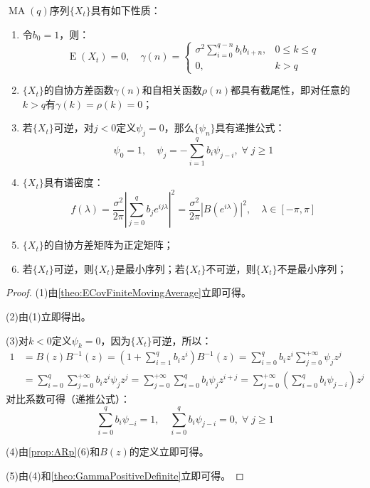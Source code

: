 \begin{property}
	$\operatorname{MA}(q)$序列$\{X_t\}$具有如下性质：
	\begin{enumerate}
		\item 令$b_0=1$，则：
		\begin{equation*}
			\operatorname{E}(X_t)=0,\quad\gamma(n)=
			\begin{cases}
				\sigma^2\sum\limits_{i=0}^{q-n}b_ib_{i+n},&0\leqslant k\leqslant q \\
				0, &k>q
			\end{cases}
		\end{equation*}
		\item $\{X_t\}$的自协方差函数$\gamma(n)$和自相关函数$\rho(n)$都具有截尾性，即对任意的$k>q$有$\gamma(k)=\rho(k)=0$；
		\item 若$\{X_t\}$可逆，对$j<0$定义$\psi_j=0$，那么$\{\psi_n\}$具有递推公式：
		\begin{equation*}
			\psi_0=1,\quad\psi_j=-\sum_{i=1}^{q}b_i\psi_{j-i},\;\forall\;j\geqslant1
		\end{equation*}
		\item $\{X_t\}$具有谱密度：
		\begin{equation*}
			f(\lambda)=\frac{\sigma^2}{2\pi}\left|\sum_{j=0}^{q}b_je^{ij\lambda}\right|^2=\frac{\sigma^2}{2\pi}|B(e^{i\lambda})|^2,\quad\lambda\in[-\pi,\pi]
		\end{equation*}
		\item $\{X_t\}$的自协方差矩阵为正定矩阵；
		\item 若$\{X_t\}$可逆，则$\{X_t\}$是最小序列；若$\{X_t\}$不可逆，则$\{X_t\}$不是最小序列；
	\end{enumerate}
\end{property}
\begin{proof}
	(1)由\cref{theo:ECovFiniteMovingAverage}立即可得。\par
	(2)由(1)立即得出。\par
	(3)对$k<0$定义$\psi_k=0$，因为$\{X_t\}$可逆，所以：
	\begin{align*}
		1&=B(z)B^{-1}(z)=\left(1+\sum_{i=1}^{q}b_iz^i\right)B^{-1}(z)=\sum_{i=0}^{q}b_iz^i\sum_{j=0}^{+\infty}\psi_jz^j \\
		&=\sum_{i=0}^{q}\sum_{j=0}^{+\infty}b_iz^i\psi_jz^j=\sum_{j=0}^{+\infty}\sum_{i=0}^{q}b_i\psi_jz^{i+j}=\sum_{j=0}^{+\infty}\left(\sum_{i=0}^{q}b_i\psi_{j-i}\right)z^j
	\end{align*}
	对比系数可得（递推公式）：
	\begin{equation*}
		\sum_{i=0}^{q}b_i\psi_{-i}=1,\quad\sum_{i=0}^{q}b_i\psi_{j-i}=0,\;\forall\;j\geqslant1
	\end{equation*}\par
	(4)由\cref{prop:ARp}(6)和$B(z)$的定义立即可得。\par
	(5)由(4)和\cref{theo:GammaPositiveDefinite}立即可得。
\end{proof}

